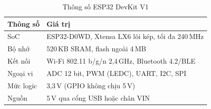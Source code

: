 \documentclass[12pt,a4paper]{extarticle}
\newcommand{\hang}{}  %
\begin{document}
\begin{table}[H]
\centering
\begin{tabularx}{\linewidth}{|p{3.6cm}|L|}
\hline
\hang \textbf{Thông số} & \textbf{Giá trị} \\ \hline
SoC & ESP32-D0WD, Xtensa LX6 lõi kép, tối đa 240\,MHz \\ \hline
Bộ nhớ & 520\,KB SRAM, flash ngoài 4\,MB \\ \hline
Kết nối & Wi-Fi 802.11 b/g/n 2,4\,GHz, Bluetooth 4.2/BLE \\ \hline
Ngoại vi & ADC 12 bit, PWM (LEDC), UART, I2C, SPI \\ \hline
Mức logic & 3,3\,V (GPIO không chịu 5\,V) \\ \hline
Nguồn & 5\,V qua cổng USB hoặc chân VIN \\ \hline
\end{tabularx}
\caption{Thông số ESP32 DevKit V1}
\label{tab:esp32}
\end{table}
\end{document}
